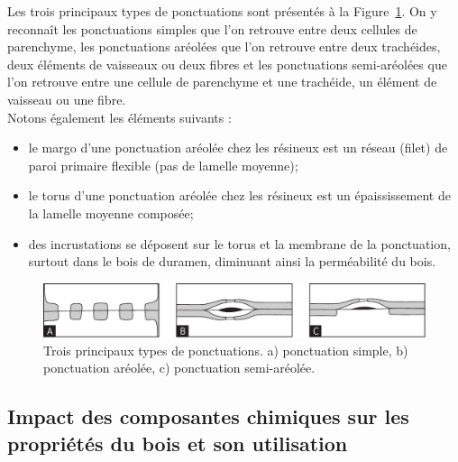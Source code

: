Les trois principaux types de ponctuations sont présentés à la Figure~\ref{fig:ponctuations2_rep}. On y reconnaît les ponctuations simples que l'on retrouve entre deux cellules de parenchyme, les ponctuations aréolées que l'on retrouve entre deux trachéides, deux éléments de vaisseaux ou deux fibres et les ponctuations semi-aréolées que l'on retrouve entre une cellule de parenchyme et une trachéide, un élément de vaisseau ou une fibre.
\\

Notons également les éléments suivants :

\begin{itemize}
\item le \og margo \fg d'une ponctuation aréolée chez les résineux est un réseau (filet) de paroi primaire flexible (pas de lamelle moyenne);
\item le \og torus \fg d'une ponctuation aréolée chez les résineux est un épaississement de la lamelle moyenne composée;
\item des incrustations se déposent sur le torus et la membrane de la ponctuation, surtout dans le bois de duramen, diminuant ainsi la perméabilité du bois.
\end{itemize}

\begin{figure}[!h]
	\centering
	\includegraphics[scale=0.7]{img/ch3_ponctuations2}
	\caption{Trois principaux types de ponctuations. a) ponctuation simple, b) ponctuation aréolée, c) ponctuation semi-aréolée.}
	\label{fig:ponctuations2_rep}
\end{figure}

\subsection{Impact des composantes chimiques sur les propriétés du bois et son utilisation}

